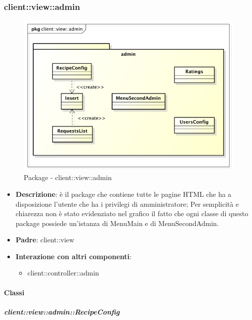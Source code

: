 \subsubsection{client::view::admin} %
\label{ssub:bdsm_app_client_view_admin}
\begin{figure}[htbp]
	\centering
	\centerline{\includegraphics[scale=0.49]{./images/client/client_view_admin.pdf}}
	\caption{Package - client::view::admin}
\end{figure}

\begin{itemize}
	\item \textbf{Descrizione}: è il package che contiene tutte le pagine HTML che ha a disposizione l'utente che ha i privilegi di amministratore;\newline
	Per semplicità e chiarezza non è stato evidenziato nel grafico il fatto che ogni classe di questo package possiede un'istanza di MenuMain e di MenuSecondAdmin.
	\item \textbf{Padre}: client::view
	\item \textbf{Interazione con altri componenti}:
		\begin{itemize}
			\item client::controller::admin
		\end{itemize}
\end{itemize}

	\paragraph{Classi} %
		\subparagraph{client::view::admin::RecipeConfig} %
		\label{subp:bdsm_app_client_view_admin_recipeconfig}

